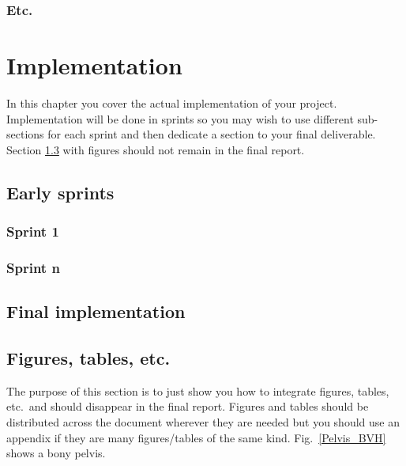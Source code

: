 \documentclass[a4paper, oneside, 11pt]{report}
\begin{document}
\subsection{Etc.}

\chapter{Implementation}\label{Impl}

In this chapter you cover the actual implementation of your project. Implementation will be done in sprints so you may wish to use different sub-sections for each sprint and then dedicate a section to your final deliverable. Section \ref{Figures} with figures  should not remain in the final report.

\section{Early sprints}
\subsection{Sprint 1}

\subsection{Sprint n}

\section{Final implementation}

\section{Figures, tables, etc.}
\label{Figures}

The purpose of this section is to just show you how to integrate figures, tables, etc.\ and should disappear in the final report. Figures and tables should be distributed across the document wherever they are needed but you should use an appendix if they are many figures/tables of the same kind. Fig.\ \ref{Pelvis_BVH} shows a bony pelvis.
\end{document}
